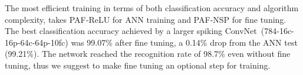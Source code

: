 
	
	
	
	The most efficient training in terms of both classification accuracy and algorithm complexity, takes PAF-ReLU for ANN training and PAF-NSP for fine tuning.
	The best classification accuracy achieved by a larger spiking ConvNet~(784-16c-16p-64c-64p-10fc) was 99.07\% after fine tuning, a 0.14\% drop from the ANN test (99.21\%).
	The network reached the recognition rate of 98.7\% even without fine tuning, thus we suggest to make fine tuning an optional step for training.

